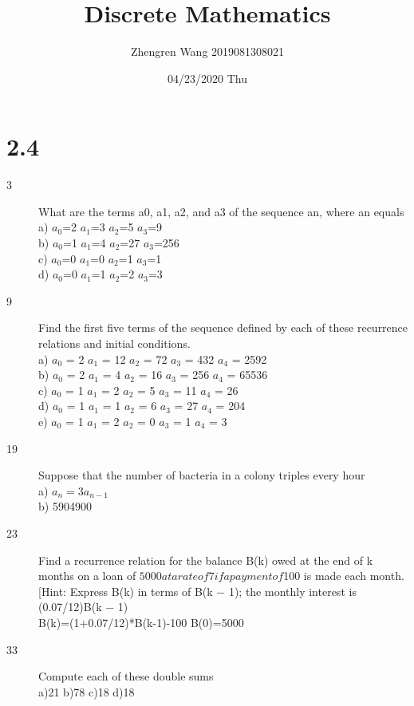\documentclass[UTF8]{article}
\title{Discrete Mathematics}
\author{Zhengren Wang 2019081308021}
\date{04/23/2020 Thu }
\begin{document}
\maketitle

\part{2.4}
\begin{description}
    \item[3]What are the terms a0, a1, a2, and a3 of the sequence {an},
where an equals \\
        a) $a_0$=2 \quad $a_1$=3 \quad $a_2$=5  \quad$a_3$=9\\
        b) $a_0$=1 \quad $a_1$=4 \quad $a_2$=27 \quad$a_3$=256\\
        c) $a_0$=0 \quad $a_1$=0 \quad $a_2$=1  \quad$a_3$=1\\
        d) $a_0$=0 \quad $a_1$=1 \quad $a_2$=2  \quad$a_3$=3\\
    \item[9]Find the first five terms of the sequence defined by each
of these recurrence relations and initial conditions.\\
        a) $a _0$ = 2 \quad $a _1$ = 12 \quad $a _2$ = 72 \quad  $a _3$ = 432 \quad    $a _4$    = 2592 \quad \\
        b) $a _0$ = 2 \quad $a _1$ = 4 \quad  $a _2$  = 16 \quad $a _3$ = 256  \quad   $a _4$    = 65536 \quad \\
        c) $a _0$ = 1 \quad $a _1$ = 2 \quad  $a _2$  = 5 \quad  $a _3$  = 11    \quad $a _4$ = 26 \quad \\
        d) $a _0$ = 1 \quad $a _1$ = 1 \quad  $a _2$  = 6 \quad  $a _3$  = 27    \quad $a _4$ = 204 \quad \\
        e) $a _0$ = 1 \quad $a _1$ = 2 \quad  $a _2$  = 0 \quad  $a _3$  = 1     \quad $a _4$ = 3 \quad \\
    \item[19] Suppose that the number of bacteria in a colony triples
every hour\\
        a) $a_n=3a_{n-1}$  \\
        b) 5904900 \\
    \item[23]Find a recurrence relation for the balance B(k) owed at
the end of k months on a loan of $5000 at a rate of 7%
if a payment of $100 is made each month. [Hint: Express B(k) in terms of B(k − 1); the monthly interest is
(0.07/12)B(k − 1) \\
        B(k)=(1+0.07/12)*B(k-1)-100 \quad B(0)=5000

    \item[33]Compute each of these double sums\\
        a)21 \quad
        b)78 \quad
        c)18 \quad
        d)18 \\
\end{description}
\end{document}
